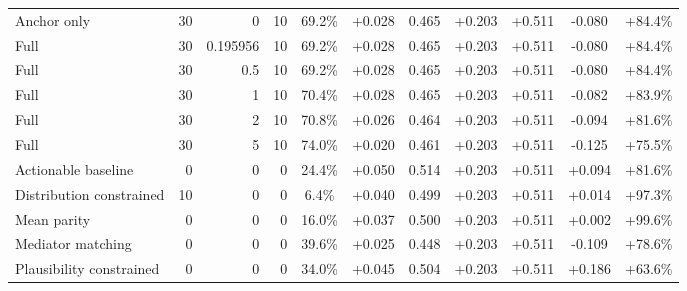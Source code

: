 \begin{table}[htbp]
\begin{tabular}{lrrrccccccc}
Anchor only & 30 & 0 & 10 & 69.2\% & +0.028 & 0.465 & +0.203 & +0.511 & -0.080 & +84.4\% \\
Full & 30 & 0.195956 & 10 & 69.2\% & +0.028 & 0.465 & +0.203 & +0.511 & -0.080 & +84.4\% \\
Full & 30 & 0.5 & 10 & 69.2\% & +0.028 & 0.465 & +0.203 & +0.511 & -0.080 & +84.4\% \\
Full & 30 & 1 & 10 & 70.4\% & +0.028 & 0.465 & +0.203 & +0.511 & -0.082 & +83.9\% \\
Full & 30 & 2 & 10 & 70.8\% & +0.026 & 0.464 & +0.203 & +0.511 & -0.094 & +81.6\% \\
Full & 30 & 5 & 10 & 74.0\% & +0.020 & 0.461 & +0.203 & +0.511 & -0.125 & +75.5\% \\
Actionable baseline & 0 & 0 & 0 & 24.4\% & +0.050 & 0.514 & +0.203 & +0.511 & +0.094 & +81.6\% \\
Distribution constrained & 10 & 0 & 0 & 6.4\% & +0.040 & 0.499 & +0.203 & +0.511 & +0.014 & +97.3\% \\
Mean parity & 0 & 0 & 0 & 16.0\% & +0.037 & 0.500 & +0.203 & +0.511 & +0.002 & +99.6\% \\
Mediator matching & 0 & 0 & 0 & 39.6\% & +0.025 & 0.448 & +0.203 & +0.511 & -0.109 & +78.6\% \\
Plausibility constrained & 0 & 0 & 0 & 34.0\% & +0.045 & 0.504 & +0.203 & +0.511 & +0.186 & +63.6\% \\
\bottomrule
\end{tabular}
\end{table}